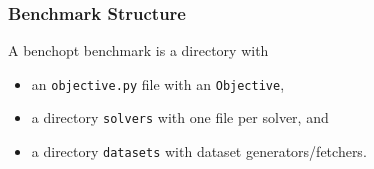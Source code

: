 \documentclass[10pt]{beamer}
\begin{document}
%
%

\begin{frame}
  \frametitle{Benchmark Structure}

  A benchopt benchmark is a directory with
  \begin{itemize}
    \item an \lstinline+objective.py+ file with an \lstinline+Objective+,
    \item a directory \lstinline+solvers+ with one file per solver, and
    \item a directory \lstinline+datasets+ with dataset generators/fetchers.
  \end{itemize}

  \medskip

\end{frame}
\end{document}
